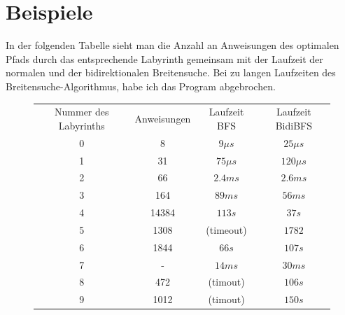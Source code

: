 \documentclass[a4paper,10pt,ngerman]{scrartcl}
\begin{document}
    \section{Beispiele}
    In der folgenden Tabelle sieht man die Anzahl an Anweisungen des optimalen Pfads durch das entsprechende Labyrinth gemeinsam mit der Laufzeit der normalen und der bidirektionalen Breitensuche.
    Bei zu langen Laufzeiten des Breitensuche-Algorithmus, habe ich das Program abgebrochen.
    \begin{figure}[H]
        \centering
        \begin{tabular}{||c | c | c | c||}
            Nummer des Labyrinths & Anweisungen & Laufzeit BFS         & Laufzeit BidiBFS \\
            0                     & 8           & $9 \mu s$            & $25 \mu s$       \\
            \hline
            1                     & 31          & $75 \mu s$           & $120 \mu s$      \\
            \hline
            2                     & 66          & $2.4 ms$             & $2.6 ms$         \\
            \hline
            3                     & 164         & $89 ms$              & $56 ms$          \\
            \hline
            4                     & 14384       & $113 s$              & $37 s$           \\
            \hline
            5                     & 1308        & (timeout)                 & $1782$           \\
            \hline
            6                     & 1844        & $66 s$               & $107 s$          \\
            \hline
            7                     & -           & $14ms$               & $30ms$           \\
            \hline
            8                     & 472         & (timout) & $106 s$          \\
            \hline
            9                     & 1012        & (timout) & $150 s$          \\
        \end{tabular}
    \end{figure}
\end{document}
